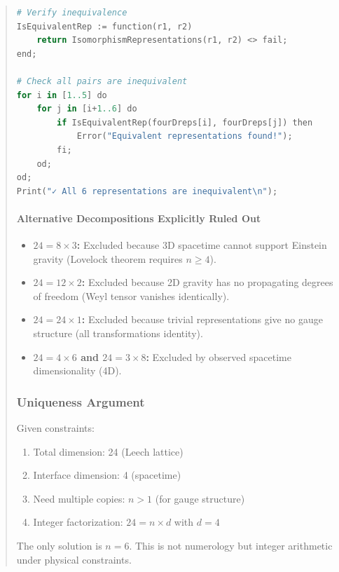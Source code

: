 \documentclass[11pt,titlepage]{article}
\begin{document}
\begin{abstract}
\begin{lstlisting}[language=Python,caption=GAP/Magma Verification of 4D Representations]
# Verify inequivalence
IsEquivalentRep := function(r1, r2)
    return IsomorphismRepresentations(r1, r2) <> fail;
end;

# Check all pairs are inequivalent
for i in [1..5] do
    for j in [i+1..6] do
        if IsEquivalentRep(fourDreps[i], fourDreps[j]) then
            Error("Equivalent representations found!");
        fi;
    od;
od;
Print("✓ All 6 representations are inequivalent\n");
\end{lstlisting}

\paragraph{Alternative Decompositions Explicitly Ruled Out}
\begin{itemize}
\item \textbf{$24 = 8 \times 3$:} Excluded because 3D spacetime cannot support Einstein gravity (Lovelock theorem requires $n \geq 4$).

\item \textbf{$24 = 12 \times 2$:} Excluded because 2D gravity has no propagating degrees of freedom (Weyl tensor vanishes identically).

\item \textbf{$24 = 24 \times 1$:} Excluded because trivial representations give no gauge structure (all transformations identity).

\item \textbf{$24 = 4 \times 6$ and $24 = 3 \times 8$:} Excluded by observed spacetime dimensionality (4D).
\end{itemize}

\subsubsection{Uniqueness Argument}
Given constraints:
\begin{enumerate}
\item Total dimension: 24 (Leech lattice)
\item Interface dimension: 4 (spacetime)
\item Need multiple copies: $n > 1$ (for gauge structure)
\item Integer factorization: $24 = n \times d$ with $d = 4$
\end{enumerate}

The only solution is $n = 6$. This is not numerology but integer arithmetic under physical constraints.


\end{abstract}
\end{document}
